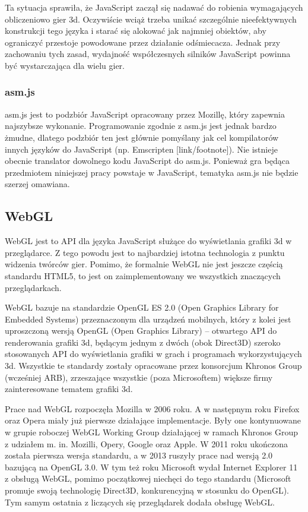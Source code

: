 Ta sytuacja sprawiła, że JavaScript zaczął się nadawać do robienia wymagających obliczeniowo
gier 3d. Oczywiście wciąż trzeba unikać szczególnie nieefektywnych konstrukcji tego języka
i starać się alokować jak najmniej obiektów, aby ograniczyć przestoje powodowane przez działanie
odśmiecacza. Jednak przy zachowaniu tych zasad, wydajność współczesnych silników JavaScript
powinna być wystarczająca dla wielu gier.


\subsubsection{asm.js}
\label{sec:asmjs}

asm.js jest to podzbiór JavaScript opracowany przez Mozillę, który zapewnia najszybsze wykonanie.
Programowanie zgodnie z asm.js jest jednak bardzo żmudne, dlatego podzbiór ten jest głównie
pomyślany jak cel kompilatorów innych języków do JavaScript (np. Emscripten [link/footnote]). Nie istnieje
obecnie translator dowolnego kodu JavaScript do asm.js. Ponieważ gra będąca przedmiotem niniejszej
pracy powstaje w JavaScript, tematyka asm.js nie będzie szerzej omawiana.

\subsection{WebGL}
\label{ssec:webgl}

WebGL jest to API dla języka JavaScript służące do wyświetlania grafiki 3d w przeglądarce.
Z tego powodu jest to najbardziej istotna technologia z punktu widzenia
twórców gier. Pomimo, że formalnie WebGL nie jest jeszcze
częścią standardu HTML5, to jest on zaimplementowany we wszystkich znaczących
przeglądarkach.

WebGL bazuje na standardzie OpenGL ES 2.0 (Open Graphics Library for
Embedded Systems) przeznaczonym dla urządzeń mobilnych, który z kolei
jest uproszczoną wersją OpenGL (Open Graphics Library) -- otwartego API do
renderowania grafiki 3d, będącym jednym z dwóch (obok Direct3D) szeroko
stosowanych API do wyświetlania grafiki w grach i programach wykorzystujących 3d.
Wszystkie te standardy zostały opracowane przez konsorcjum Khronos Group (wcześniej ARB),
zrzeszające wszystkie (poza Microsoftem) większe firmy zainteresowane tematem grafiki 3d.

Prace nad WebGL rozpoczęła Mozilla w 2006 roku. A w następnym roku Firefox oraz Opera
miały już pierwsze działające implementacje. Były one kontynuowane w grupie roboczej
WebGL Working Group działającej w ramach Khronos Group z udziałem m. in. Mozilli,
Opery, Google oraz Apple. W 2011 roku ukończona została pierwsza wersja standardu, a w 2013
ruszyły prace nad wersją 2.0 bazującą na OpenGL 3.0. W tym też roku Microsoft wydał
Internet Explorer 11 z obsługą WebGL, pomimo początkowej niechęci do tego standardu
(Microsoft promuje swoją technologię Direct3D, konkurencyjną w stosunku do OpenGL).
Tym samym ostatnia z liczących się przeglądarek dodała obsługę WebGL.

